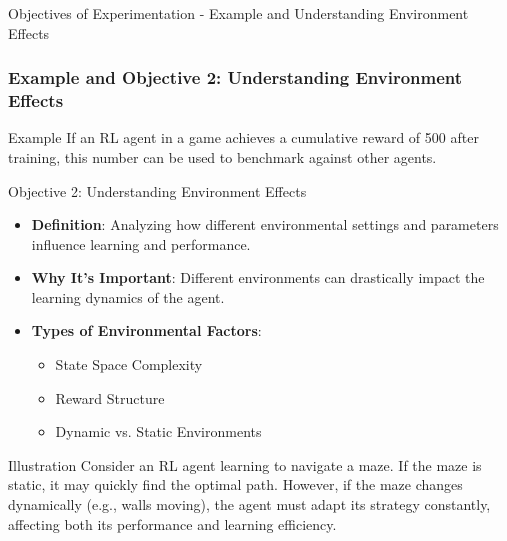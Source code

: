 \documentclass[aspectratio=169]{beamer}
\begin{document}
\begin{frame}[fragile]{Objectives of Experimentation - Example and Understanding Environment Effects}
    \frametitle{Example and Objective 2: Understanding Environment Effects}

    \begin{block}{Example}
        If an RL agent in a game achieves a cumulative reward of 500 after training, this number can be used to benchmark against other agents.
    \end{block}

    \begin{block}{Objective 2: Understanding Environment Effects}
        \begin{itemize}
            \item \textbf{Definition}: Analyzing how different environmental settings and parameters influence learning and performance.
            \item \textbf{Why It's Important}: Different environments can drastically impact the learning dynamics of the agent.
            \item \textbf{Types of Environmental Factors}:
                \begin{itemize}
                    \item State Space Complexity
                    \item Reward Structure
                    \item Dynamic vs. Static Environments
                \end{itemize}
        \end{itemize}
    \end{block}

    \begin{block}{Illustration}
        Consider an RL agent learning to navigate a maze. If the maze is static, it may quickly find the optimal path. However, if the maze changes dynamically (e.g., walls moving), the agent must adapt its strategy constantly, affecting both its performance and learning efficiency.
    \end{block}

\end{frame}
\end{document}
